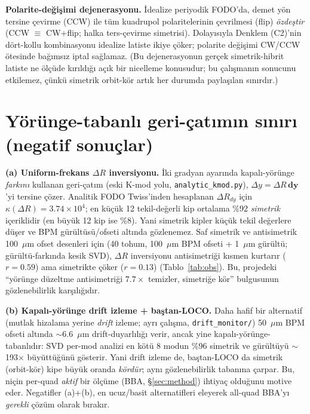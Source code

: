 \documentclass[twocolumn,a4paper,10pt]{article}
\begin{document}
\textbf{Polarite-değişimi dejenerasyonu.} İdealize periyodik FODO'da, demet yön
tersine çevirme (CCW) ile tüm kuadrupol polaritelerinin çevrilmesi (flip)
\emph{özdeştir} (CCW $\equiv$ CW+flip; halka ters-çevirme simetrisi). Dolayısıyla
Denklem (C2)'nin dört-kollu kombinasyonu idealize latiste ikiye çöker; polarite
değişimi CW/CCW ötesinde bağımsız iptal sağlamaz. (Bu dejenerasyonun gerçek
simetrik-hibrit latiste ne ölçüde kırıldığı açık bir nicelleme konusudur; bu
çalışmanın sonucunu etkilemez, çünkü simetrik orbit-kör artık her durumda
paylaşılan sınırdır.)

\section{Yörünge-tabanlı geri-çatımın sınırı (negatif sonuçlar)}
\label{sec:negative}
\textbf{(a) Uniform-frekans $\Delta R$ inversiyonu.} İki gradyan ayarında
kapalı-yörünge \emph{farkını} kullanan geri-çatım (eski K-mod yolu,
\texttt{analytic\_kmod.py}), $\Delta y = \Delta R\,\mathbf{dy}$'yi tersine çözer.
Analitik FODO Twiss'inden hesaplanan $\Delta R_{dy}$ için
$\kappa(\Delta R) = 3.74\times10^4$; en küçük 12 tekil-değerli kip ortalama
\%92 \emph{simetrik} içeriklidir (en büyük 12 kip ise \%8). Yani simetrik kipler
küçük tekil değerlere düşer ve BPM gürültüsü/ofseti altında gözlenemez. Saf
simetrik ve antisimetrik 100~$\mu$m ofset desenleri için (40 tohum, 100~$\mu$m BPM
ofseti + 1~$\mu$m gürültü; gürültü-farkında kesik SVD), $\Delta R$ inversiyonu
antisimetriği kısmen kurtarır ($r = 0.59$) ama simetrikte çöker ($r = 0.13$)
(Tablo~\ref{tab:obs}). Bu, projedeki ``yörünge düzeltme antisimetriği
$7.7\times$ temizler, simetriğe kör'' bulgusunun gözlenebilirlik karşılığıdır.

\textbf{(b) Kapalı-yörünge drift izleme + baştan-LOCO.} Daha hafif bir alternatif
(mutlak hizalama yerine \emph{drift} izleme; ayrı çalışma, \texttt{drift\_monitor/})
50~$\mu$m BPM ofseti altında $\sim$6.6~$\mu$m drift-duyarlılığı verir, ancak yine
kapalı-yörünge-tabanlıdır: SVD per-mod analizi en kötü 8 modun \%96 simetrik ve
gürültüyü $\sim$193$\times$ büyüttüğünü gösterir. Yani drift izleme de, baştan-LOCO
da simetrik (orbit-kör) kipe büyük oranda \emph{kördür}; aynı gözlenebilirlik
tabanına çarpar. Bu, niçin per-quad \emph{aktif} bir ölçüme (BBA, §\ref{sec:method})
ihtiyaç olduğunu motive eder. Negatifler (a)+(b), en ucuz/basit alternatifleri
eleyerek all-quad BBA'yı \emph{gerekli} çözüm olarak bırakır.
\end{document}
